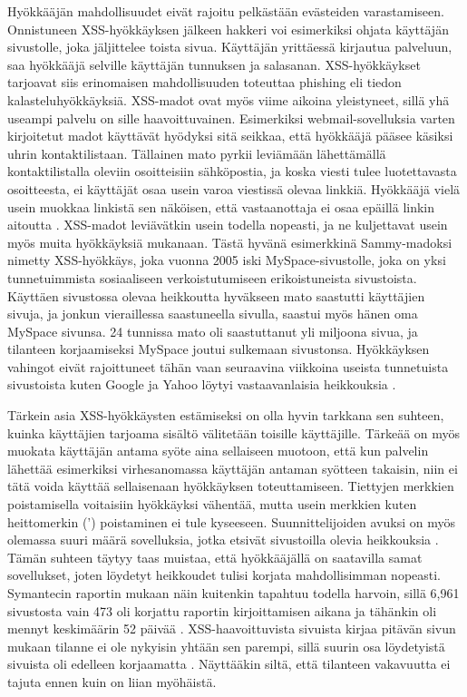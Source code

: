 Hyökkääjän mahdollisuudet eivät rajoitu pelkästään evästeiden varastamiseen. Onnistuneen XSS-hyökkäyksen jälkeen hakkeri voi esimerkiksi ohjata
käyttäjän sivustolle, joka jäljittelee toista sivua. Käyttäjän yrittäessä kirjautua palveluun, saa hyökkääjä selville käyttäjän tunnuksen ja
salasanan. XSS-hyökkäykset tarjoavat siis erinomaisen mahdollisuuden toteuttaa phishing eli tiedon kalasteluhyökkäyksiä. XSS-madot ovat
myös viime aikoina yleistyneet, sillä yhä useampi palvelu on sille haavoittuvainen. Esimerkiksi webmail-sovelluksia varten kirjoitetut madot 
käyttävät hyödyksi sitä seikkaa, että hyökkääjä pääsee käsiksi uhrin kontaktilistaan. Tällainen mato pyrkii leviämään lähettämällä 
kontaktilistalla oleviin osoitteisiin sähköpostia, ja koska viesti tulee luotettavasta osoitteesta, ei käyttäjät osaa usein varoa viestissä
olevaa linkkiä. Hyökkääjä vielä usein muokkaa linkistä sen näköisen, että vastaanottaja ei osaa epäillä linkin aitoutta \cite{WEB2}. 
XSS-madot leviävätkin usein todella nopeasti, ja ne kuljettavat usein myös muita hyökkäyksiä mukanaan. Tästä hyvänä esimerkkinä
Sammy-madoksi nimetty XSS-hyökkäys, joka vuonna 2005 iski MySpace-sivustolle, joka on yksi tunnetuimmista sosiaaliseen verkoistutumiseen
erikoistuneista sivustoista. Käyttäen sivustossa olevaa heikkoutta hyväkseen mato saastutti käyttäjien sivuja, ja jonkun vieraillessa 
saastuneella sivulla, saastui myös hänen oma MySpace sivunsa. 24 tunnissa mato oli saastuttanut yli miljoona sivua, ja tilanteen korjaamiseksi
MySpace joutui sulkemaan sivustonsa. Hyökkäyksen vahingot eivät rajoittuneet tähän vaan seuraavina viikkoina useista tunnetuista sivustoista
kuten Google ja Yahoo löytyi vastaavanlaisia heikkouksia \cite{WEB2b}.

Tärkein asia XSS-hyökkäysten estämiseksi on olla hyvin tarkkana sen suhteen, kuinka käyttäjien tarjoama sisältö välitetään toisille käyttäjille.
Tärkeää on myös muokata käyttäjän antama syöte aina sellaiseen muotoon, että kun palvelin lähettää esimerkiksi virhesanomassa käyttäjän antaman syötteen
takaisin, niin ei tätä voida käyttää sellaisenaan hyökkäyksen toteuttamiseen. Tiettyjen merkkien poistamisella voitaisiin hyökkäyksi vähentää,
mutta usein merkkien kuten heittomerkin (') poistaminen ei tule kyseeseen. Suunnittelijoiden avuksi on myös olemassa suuri määrä sovelluksia, jotka
etsivät sivustoilla olevia heikkouksia \cite{WEB2}. Tämän suhteen täytyy taas muistaa, että hyökkääjällä on saatavilla samat sovellukset, joten 
löydetyt heikkoudet tulisi korjata mahdollisimman nopeasti. Symantecin raportin mukaan näin kuitenkin tapahtuu todella harvoin, sillä 6,961 
sivustosta vain 473 oli korjattu raportin kirjoittamisen aikana ja tähänkin oli mennyt keskimäärin 52 päivää \cite{SYM}. XSS-haavoittuvista sivuista
kirjaa pitävän sivun mukaan tilanne ei ole nykyisin yhtään sen parempi, sillä suurin osa löydetyistä sivuista oli edelleen korjaamatta \cite{XSS}.
Näyttääkin siltä, että tilanteen vakavuutta ei tajuta ennen kuin on liian myöhäistä.

